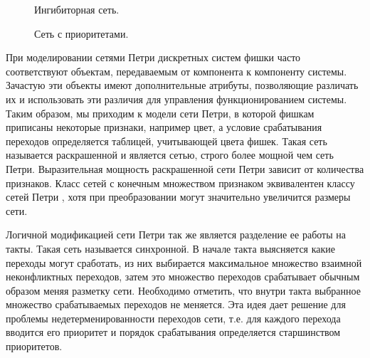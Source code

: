 \begin{figure}
	\begin{minipage}[H]{0.49\linewidth}
		\caption{Ингибиторная сеть.}
		\label{fig:fig3}
	\end{minipage}
	\hfill
	\begin{minipage}[H]{0.49\linewidth}
		\caption{Сеть с приоритетами.}
		\label{fig:fig4}
	\end{minipage}
\end{figure}

При моделировании сетями Петри дискретных систем фишки часто соответствуют объектам, передаваемым от компонента к компоненту системы. Зачастую эти объекты имеют дополнительные атрибуты, позволяющие различать их и использовать эти различия для управления функционированием системы. Таким образом, мы приходим к модели сети Петри, в которой фишкам приписаны некоторые признаки, например цвет, а условие срабатывания переходов определяется таблицей, учитывающей цвета фишек. Такая сеть называется раскрашенной и является сетью, строго более мощной чем сеть Петри. Выразительная мощность раскрашенной сети Петри зависит от количества признаков. Класс сетей с конечным множеством признаком эквивалентен классу сетей Петри \cite{Kotov} \cite{Jensen}, хотя при преобразовании могут значительно увеличится размеры сети. 

Логичной модификацией сети Петри так же является разделение ее работы на такты. Такая сеть называется синхронной. В начале такта выясняется какие переходы могут сработать, из них выбирается максимальное множество взаимной неконфликтных переходов, затем это множество переходов срабатывает обычным образом меняя разметку сети. Необходимо отметить, что внутри такта выбранное множество срабатываемых переходов не меняется. Эта идея дает решение для проблемы недетерменированности переходов сети, т.е. для каждого перехода вводится его приоритет и порядок срабатывания определяется старшинством приоритетов. 

